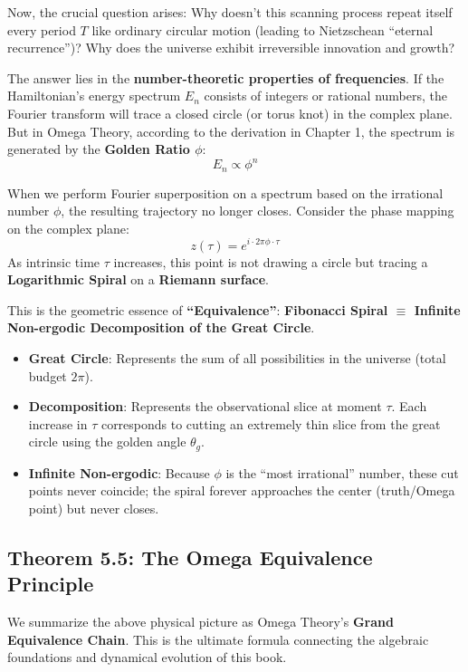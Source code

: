 Now, the crucial question arises: Why doesn't this scanning process repeat itself every period $T$ like ordinary circular motion (leading to Nietzschean ``eternal recurrence'')? Why does the universe exhibit irreversible innovation and growth?

The answer lies in the \textbf{number-theoretic properties of frequencies}.
If the Hamiltonian's energy spectrum $E_n$ consists of integers or rational numbers, the Fourier transform will trace a closed circle (or torus knot) in the complex plane. But in Omega Theory, according to the derivation in Chapter 1, the spectrum is generated by the \textbf{Golden Ratio $\phi$}:
\[E_n \propto \phi^n\]

When we perform Fourier superposition on a spectrum based on the irrational number $\phi$, the resulting trajectory no longer closes.
Consider the phase mapping on the complex plane:
\[z(\tau) = e^{i \cdot 2\pi \phi \cdot \tau}\]
As intrinsic time $\tau$ increases, this point is not drawing a circle but tracing a \textbf{Logarithmic Spiral} on a \textbf{Riemann surface}.

This is the geometric essence of \textbf{``Equivalence''}:
\textbf{Fibonacci Spiral $\equiv$ Infinite Non-ergodic Decomposition of the Great Circle}.

\begin{itemize}
\item \textbf{Great Circle}: Represents the sum of all possibilities in the universe (total budget $2\pi$).
\item \textbf{Decomposition}: Represents the observational slice at moment $\tau$. Each increase in $\tau$ corresponds to cutting an extremely thin slice from the great circle using the golden angle $\theta_g$.
\item \textbf{Infinite Non-ergodic}: Because $\phi$ is the ``most irrational'' number, these cut points never coincide; the spiral forever approaches the center (truth/Omega point) but never closes.
\end{itemize}

\subsection{Theorem 5.5: The Omega Equivalence Principle}

We summarize the above physical picture as Omega Theory's \textbf{Grand Equivalence Chain}. This is the ultimate formula connecting the algebraic foundations and dynamical evolution of this book.

